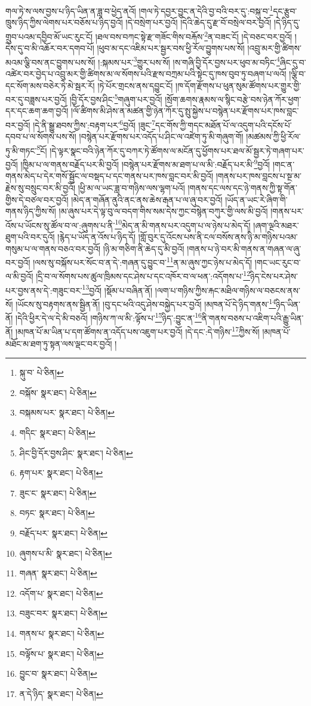 གལ་ཏེ་ས་ལས་བྱས་པ་ཉིད་ཡིན་ན་ཟླ་བ་ཕྱེད་ནའོ། །གལ་ཏེ་དབྱར་བྱུང་ན་དེའི་བྱ་བའི་བར་དུ་:བསྐུ་བ་\footnote{སྐུ་བ་  པེ་ཅིན། }དང་རྩུབ་ཁྲུས་ཉིད་ཀྱིས་ལེགས་པར་བཅོས་པ་ཉིད་བྱའོ། །དེ་བསྲེག་པར་བྱའོ། །དེའི་ཆེད་དུ་རྫ་བོ་བསྲེལ་བར་བྱའོ། །དེ་ཉིད་དུ་གྲུབ་པའམ་དབྱིབ་མོ་ཡང་རུང་ངོ། །ཐལ་བས་བཀང་སྟེ་རྫ་གཟོང་གིས་བརྐོས་\footnote{བསྐོས་  སྣར་ཐང་།  པེ་ཅིན། }ན་བཟང་ངོ། །དེ་བཅང་བར་བྱའོ། །དེས་དུ་བ་མི་འཆོར་བར་དགབ་པོ། །ཕུབ་མ་དང་འཇིམ་པར་སྦྱར་བས་ཕྱི་རོལ་བྱུགས་པས་སོ། །འབྲུ་མར་གྱི་ཚིགས་མའམ་ལྕི་བས་ནང་བྱུགས་པས་སོ། །:སྐམས་པར་\footnote{བསྐམས་པར་  སྣར་ཐང་།  པེ་ཅིན། }གྱུར་པས་སོ། །ས་གཞི་བྱི་དོར་བྱས་པར་ཕུབ་མ་བཏིང་\footnote{གདིང་  སྣར་ཐང་།  པེ་ཅིན། }ཞིང་དུ་བ་འཚེར་བར་བྱེད་པ་འབྲུ་མར་གྱི་ཚིགས་མ་ལ་སོགས་པའི་རྫས་བཀྲམ་པའི་སྟེང་དུ་ཁས་བུབ་ཏུ་བཞག་པ་ལའོ། །ལྕི་བ་དང་སོག་མས་བཅེར་ཏེ་མེ་སྦར་རོ། །ཏེ་པོར་གྲངས་ནས་དབྱུང་ངོ། །ཁ་དོག་རྫོགས་པ་ཕུན་སུམ་ཚོགས་པར་གྱུར་གྱི་བར་དུ་བཟླས་པར་བྱའོ། །བྱི་དོར་བྱས་ཤིང་\footnote{ཤིང་བྱི་དོར་བྱས་ཤིང་  སྣར་ཐང་།  པེ་ཅིན། }གཞུག་པར་བྱའོ། །སྲོག་ཆགས་རྣམས་ལ་སྙིང་བརྩེ་བས་ཉེན་ཀོར་ཕྱག་དར་དང་ཆག་ཆག་བྱའོ། །ལོ་ཚིགས་མི་ཤེས་ན་མཚན་གྱི་ཉེན་ཀོར་དུ་སྤུ་སྐྱེས་པ་བསྙེན་པར་རྫོགས་པར་ཁས་བླང་བར་བྱའོ། །དེ་ནི་སྒྱུ་ཐབས་ཀྱིས་:བརྟག་པར་\footnote{རྟག་པར་  སྣར་ཐང་།  པེ་ཅིན། }བྱའོ། །ཟུང་\footnote{ཟུང་ང་  སྣར་ཐང་།  པེ་ཅིན། }དང་གོས་ཀྱི་གདང་མཐོན་པོ་ལ་འདུག་པའི་དངོས་པོ་དབབ་པ་ལ་སོགས་པས་སོ། །བསྙེན་པར་རྫོགས་པར་འདོད་པ་ཤིང་ལ་འཛེག་ཏུ་མི་གཞུག་གོ། །མཚམས་ཀྱི་ཕྱི་རོལ་ཏུ་མི་གཏང་\footnote{བཏང་  སྣར་ཐང་།  པེ་ཅིན། }ངོ། །དེ་ལྟར་སྣང་བའི་ཉེན་ཀོར་དུ་བཀར་ཏེ་ཚོགས་ལ་མངོན་དུ་ཕྱོགས་པར་ཐལ་མོ་སྦྱར་ཏེ་གཞག་པར་བྱའོ། །ཁྱིམ་པ་ལ་གནས་བརྗོད་པར་མི་བྱའོ། །བསྙེན་པར་རྫོགས་མ་ཐག་པ་ལ་མི་:བརྗོད་པར་མི་\footnote{བརྗོད་པར་  སྣར་ཐང་།  པེ་ཅིན། }བྱའོ། །གང་ན་གནས་མེད་པ་དེར་གསོ་སྦྱོང་ལ་བསྡད་པ་དང་གནས་པར་ཁས་བླང་བར་མི་བྱའོ། །གནས་པར་ཁས་བླངས་པ་སྔ་མ་རྗེས་སུ་བསྲུང་བར་མི་བྱའོ། །ཕྱི་མ་ལ་ཡང་ཟླ་བ་གཉིས་ལས་ལྷག་པའོ། །གནས་དང་ལས་དང་ཉེ་གནས་ཀྱི་སྟ་གོན་གྱིས་དེ་བཙལ་བར་བྱའོ། །མེད་ན་གཞོན་ནུའི་ནང་ནས་ཆེས་རྒན་པ་ལ་ཞུ་བར་བྱའོ། །ཡོད་ན་ཡང་རེ་ཞིག་གི་གནས་ཉིད་ཀྱིས་སོ། །མ་ཞུས་པར་དེ་ལྟ་བུ་ལ་བདག་གིས་སམ་དེས་ཀྱང་བསྙེན་བཀུར་གྱི་ལས་མི་བྱའོ། །གནས་པར་འོས་པ་ཡོངས་སུ་ཚོལ་བ་ལ་:ཞུགས་པ་ནི་\footnote{ཞུགས་པ་མི་  སྣར་ཐང་།  པེ་ཅིན། }མེད་ན་མི་གནས་པར་འདུག་པ་ལ་ཉེས་པ་མེད་དོ། །ཞག་ལྔའི་མཐར་ཐུག་པའི་བར་དུའོ། །རྙེད་པ་ཡོད་ན་འོས་པ་ཉིད་དོ། །གློ་བུར་དུ་འོངས་པས་ནི་ངལ་བསོས་ནས་ཉི་མ་གཉིས་པའམ་གསུམ་པ་ལ་གནས་བཅའ་བར་བྱའོ། །ཉི་མ་གཅིག་ནི་ཆེད་དུ་མི་བྱའོ། །གནས་པ་ཉེ་བར་མི་གནས་ན་གཞན་ལ་ཞུ་བར་བྱའོ། །ལས་སུ་བསྐོས་པར་སོང་བ་ན་དེ་:གཞན་དུ་བྱུང་བ་\footnote{གཞན་  སྣར་ཐང་།  པེ་ཅིན། }ན་མ་ཞུས་ཀྱང་ཉེས་པ་མེད་དོ། །གང་ཡང་རུང་བ་ལ་མི་བྱའོ། །དྲི་བ་ལ་སོགས་པས་ཚུལ་ཁྲིམས་དང་ཤེས་པ་དང་འཁོར་བ་ལ་ཕན་:འདོགས་པ་\footnote{འདོག་པ་  སྣར་ཐང་།  པེ་ཅིན། }ཉིད་ངེས་པར་ཤེས་པར་བྱས་ནས་དེ་:གཟུང་བར་\footnote{བཟུང་བར་  སྣར་ཐང་།  པེ་ཅིན། }བྱའོ། །སྡོམ་པ་བཞིན་ནོ། །ལག་པ་གཉིས་ཀྱིས་རྐང་མཐིལ་གཉིས་ལ་བཅངས་ནས་སོ། །ཡོངས་སུ་བརྟགས་ནས་སྦྱིན་ནོ། །བུ་དང་ཕའི་འདུ་ཤེས་བསྐྱེད་པར་བྱའོ། །མཁན་པོ་དེ་ཉིད་གནས་\footnote{གནས་པ་  སྣར་ཐང་།  པེ་ཅིན། }ཉིད་ཡིན་ནོ། །དེའི་ཕྱིར་དེ་ལ་དེ་མི་བཅའོ། །གཉིས་ཀ་ལ་མི་:ལྟོས་པ་\footnote{བལྟོས་པ་  སྣར་ཐང་།  པེ་ཅིན། }ཉིད་:བྱུང་ན་\footnote{བྱུང་བ་  སྣར་ཐང་།  པེ་ཅིན། }ནི་གནས་བཅས་པ་འཇིག་པའི་རྒྱུ་ཡིན་ནོ། །མཁན་པོ་མ་ཡིན་པ་དག་ཚོགས་ན་འདོད་པས་འཇུག་པར་བྱའོ། །དེ་དང་:དེ་གཉིས་\footnote{ན་དེ་ཉིད་  སྣར་ཐང་།  པེ་ཅིན། }ཀྱིས་སོ། །མཁན་པོ་མཐོང་མ་ཐག་ཏུ་སྟན་ལས་ལྡང་བར་བྱའོ། །
